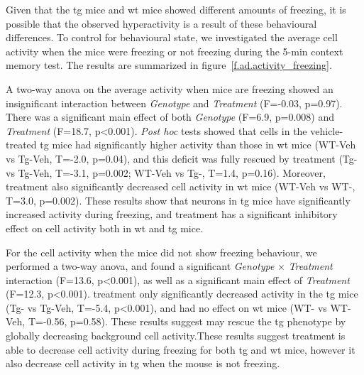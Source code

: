 Given that the \gls{tg} mice and \gls{wt} mice showed different amounts of freezing, it is possible that the observed hyperactivity is a result of these behavioural differences. To control for behavioural state, we investigated the average cell activity when the mice were freezing or not freezing during the 5-min context memory test. The results are summarized in figure~\ref{f.ad.activity_freezing}.  

A two-way \gls{anova} on the average activity when mice are freezing showed an insignificant interaction between \textit{Genotype} and \textit{Treatment} (F=-0.03, p=0.97). There was a significant main effect of both \textit{Genotype} (F=6.9, p=0.008) and \textit{Treatment} (F=18.7, p<0.001). \textit{Post hoc} tests showed that cells in the vehicle-treated \gls{tg} mice had significantly higher activity than those in \gls{wt} mice (WT-Veh vs Tg-Veh, T=-2.0, p=0.04), and this deficit was fully rescued by \tglu{} treatment (Tg-\glu{} vs Tg-Veh, T=-3.1, p=0.002; WT-Veh vs Tg-\glu{}, T=1.4, p=0.16). Moreover, \tglu{} treatment also significantly decreased cell activity in \gls{wt} mice (WT-Veh vs WT-\glu{}, T=3.0, p=0.002). These results show that neurons in \Gls{tg} mice have significantly increased activity during freezing, and \tglu{} treatment has a significant inhibitory effect on cell activity both in \gls{wt} and \gls{tg} mice. 

For the cell activity when the mice did not show freezing behaviour, we performed a two-way \gls{anova}, and found a significant \textit{Genotype} $\times$ \textit{Treatment} interaction (F=13.6, p<0.001), as well as a significant main effect of \textit{Treatment} (F=12.3, p<0.001). \tglu{} treatment only significantly decreased activity in the \gls{tg} mice (Tg-\glu{} vs Tg-Veh, T=-5.4, p<0.001), and had no effect on \gls{wt} mice (WT-\glu{} vs WT-Veh, T=-0.56, p=0.58). These results suggest \tglu{} may rescue the \gls{tg} phenotype by globally decreasing background cell activity.These results suggest \tglu{} treatment is able to decrease cell activity during freezing for both \gls{tg} and \gls{wt} mice, however it also decrease cell activity in \gls{tg} when the mouse is not freezing.


